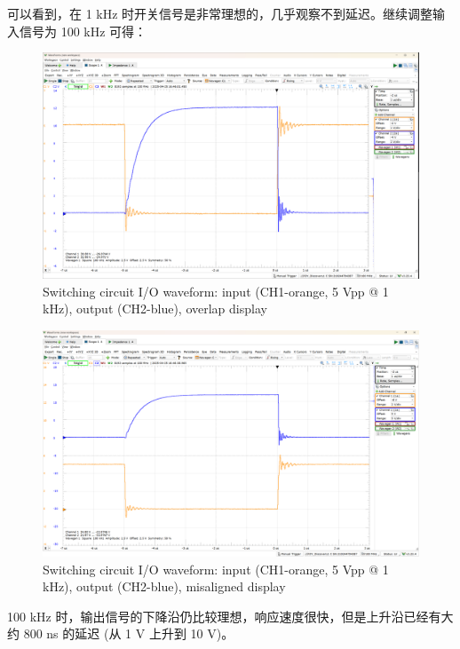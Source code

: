 \documentclass[UTF8]{article}
\begin{document}
可以看到，在 1 kHz 时开关信号是非常理想的，几乎观察不到延迟。继续调整输入信号为 100 kHz 可得：
\begin{figure}[H]\centering
    \includegraphics[width=\columnwidth]{LCE-04-场效应管/assets/switching circuit/开关 input-output 100kHz.png}
    \caption{Switching circuit I/O waveform: input (CH1-orange, 5 Vpp @ 1 kHz), output (CH2-blue), overlap display}
\end{figure}
\begin{figure}[H]\centering
    \includegraphics[width=\columnwidth]{LCE-04-场效应管/assets/switching circuit/开关 input-output 100kHz (2).png}
    \caption{Switching circuit I/O waveform: input (CH1-orange, 5 Vpp @ 1 kHz), output (CH2-blue), misaligned display}
\end{figure}

100 kHz 时，输出信号的下降沿仍比较理想，响应速度很快，但是上升沿已经有大约 800 ns 的延迟 (从 1 V 上升到 10 V)。

\end{document}
